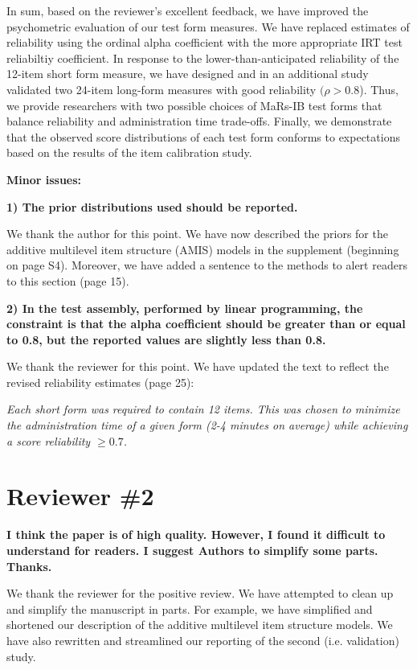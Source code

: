 \documentclass[a4paper,notitlepage,12pt]{article}
\begin{document}
In sum, based on the reviewer's excellent feedback, we have improved the psychometric evaluation of our test form measures. We have replaced estimates of reliability using the ordinal alpha coefficient with the more appropriate IRT test reliabiltiy coefficient. In response to the lower-than-anticipated reliability of the 12-item short form measure, we have designed and in an additional study validated two 24-item long-form measures with good reliability $(\rho > 0.8$). Thus, we provide researchers with two possible choices of MaRs-IB test forms that balance reliability and administration time trade-offs. Finally, we demonstrate that the observed score distributions of each test form conforms to expectations based on the results of the item calibration study.

\textbf{Minor issues:}


\textbf{1) The prior distributions used should be reported.}

We thank the author for this point. We have now described the priors for the additive multilevel item structure (AMIS) models in the supplement (beginning on page S4). Moreover, we have added a sentence to the methods to alert readers to this section (page 15). 


\textbf{2) In the test assembly, performed by linear programming, the constraint is that the alpha coefficient should be greater than or equal to 0.8, but the reported values are slightly less than 0.8.}

We thank the reviewer for this point. We have updated the text to reflect the revised reliability estimates (page 25):

\begin{displayquote}
\textit{Each short form was required to contain 12 items. This was chosen to minimize the administration time of a given form (2-4 minutes on average) while achieving a score reliability $\geq 0.7$.}
\end{displayquote}

\section*{Reviewer \#2}

\textbf{I think the paper is of high quality. However, I found it difficult to understand for readers. I suggest Authors to simplify some parts. Thanks.}

We thank the reviewer for the positive review. We have attempted to clean up and simplify the manuscript in parts. For example, we have simplified and shortened our description of the additive multilevel item structure models. We have also rewritten and streamlined our reporting of the second (i.e. validation) study. 

\printbibliography
\end{document}
